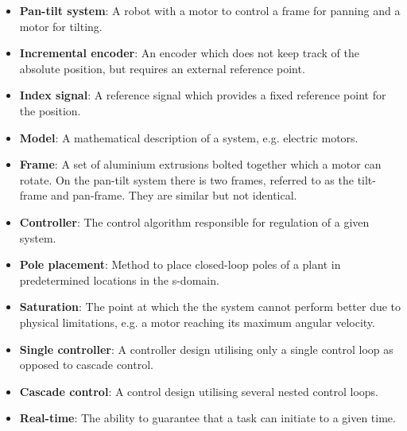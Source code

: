 \documentclass[../../main.tex]{subfiles}
\begin{document}
\label{sec:wordlist}
\begin{itemize}
    \item \textbf{Pan-tilt system}: A robot with a motor to control a frame for panning and a motor for tilting.
    \item \textbf{Incremental encoder}: An encoder which does not keep track of the absolute position, but requires an external reference point.
    \item \textbf{Index signal}: A reference signal which provides a fixed reference point for the position.
    \item \textbf{Model}: A mathematical description of a system, e.g. electric motors. 
    \item \textbf{Frame}: A set of aluminium extrusions bolted together which a motor can rotate. On the pan-tilt system there is two frames, referred to as the tilt-frame and pan-frame. They are similar but not identical.
    \item \textbf{Controller}: The control algorithm responsible for regulation of a given system.
    \item \textbf{Pole placement}: Method to place closed-loop poles of a plant in predetermined locations in the s-domain.
    \item \textbf{Saturation}: The point at which the the system cannot perform better due to physical limitations, e.g. a motor reaching its maximum angular velocity.
    \item \textbf{Single controller}: A controller design utilising only a single control loop as opposed to cascade control.
    \item \textbf{Cascade control}: A control design utilising several nested control loops.
    \item \textbf{Real-time}: The ability to guarantee that a task can initiate to a given time.

\end{itemize}
\end{document}
